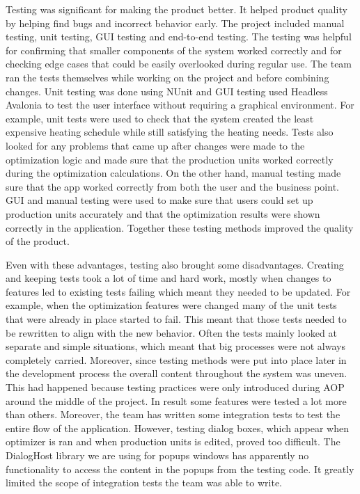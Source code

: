 Testing was significant for making the product better. It helped product quality by helping find bugs and incorrect behavior early. The project included manual testing, unit testing, GUI testing and end-to-end testing. The testing was helpful for confirming that smaller components of the system worked correctly and for checking edge cases that could be easily overlooked during regular use. The team ran the tests themselves while working on the project and before combining changes. Unit testing was done using NUnit and GUI testing used Headless Avalonia to test the user interface without requiring a graphical environment. For example, unit tests were used to check that the system created the least expensive heating schedule while still satisfying the heating needs. Tests also looked for any problems that came up after changes were made to the optimization logic and made sure that the production units worked correctly during the optimization calculations. On the other hand, manual testing made sure that the app worked correctly from both the user and the business point. GUI and manual testing were used to make sure that users could set up production units accurately and that the optimization results were shown correctly in the application. Together these testing methods improved the quality of the product.\par

Even with these advantages, testing also brought some disadvantages. Creating and keeping tests took a lot of time and hard work, mostly when changes to features led to existing tests failing which meant they needed to be updated. For example, when the optimization features were changed many of the unit tests that were already in place started to fail. This meant that those tests needed to be rewritten to align with the new behavior. Often the tests mainly looked at separate and simple situations, which meant that big processes were not always completely carried. Moreover, since testing methods were put into place later in the development process the overall content throughout the system was uneven. This had happened because testing practices were only introduced during AOP around the middle of the project. In result some features were tested a lot more than others. Moreover, the team has written some integration tests to test the entire flow of the application. However, testing dialog boxes, which appear when optimizer is ran and when production units is edited, proved too difficult. The DialogHost library we are using for popups windows has apparently no functionality to access the content in the popups from the testing code. It greatly limited the scope of integration tests the team was able to write.\par

